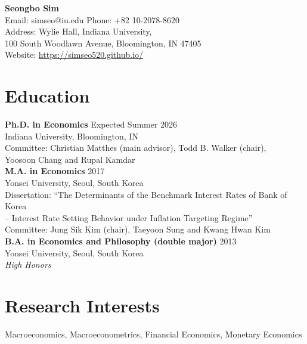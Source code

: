 \documentclass[11pt,a4paper]{article}
\begin{document}
\onehalfspacing

\pagestyle{plain}

\begin{center}
    {\LARGE \textbf{Seongbo Sim}} \\
    \vspace{2mm}
    Email: simseo@iu.edu \quad Phone: +82 10-2078-8620 \\
    Address: Wylie Hall, Indiana University, \\ 100 South Woodlawn Avenue, Bloomington, IN 47405 \\    
    Website: \url{https://simseo520.github.io/}
\end{center}

\vspace{5mm}

\section*{Education}
\textbf{Ph.D. in Economics} \hfill Expected Summer 2026 \\
Indiana University, Bloomington, IN \\
Committee: Christian Matthes (main advisor), Todd B. Walker (chair), \\\phantom{Committee:} Yoosoon Chang and Rupal Kamdar \\

\textbf{M.A. in Economics} \hfill 2017 \\
Yonsei University, Seoul, South Korea\\
Dissertation: “The Determinants of the Benchmark Interest Rates of Bank of Korea\\
\phantom{Dissertation:} -- {\footnotesize Interest Rate Setting Behavior under Inflation Targeting Regime}” \\
Committee: Jung Sik Kim (chair), Taeyoon Sung and Kwang Hwan Kim\\


\textbf{B.A. in Economics and Philosophy (double major)} \hfill 2013 \\
Yonsei University, Seoul, South Korea\\
\emph{High Honors}\\

\section*{Research Interests}
Macroeconomics, Macroeconometrics, Financial Economics, Monetary Economics
\end{document}
